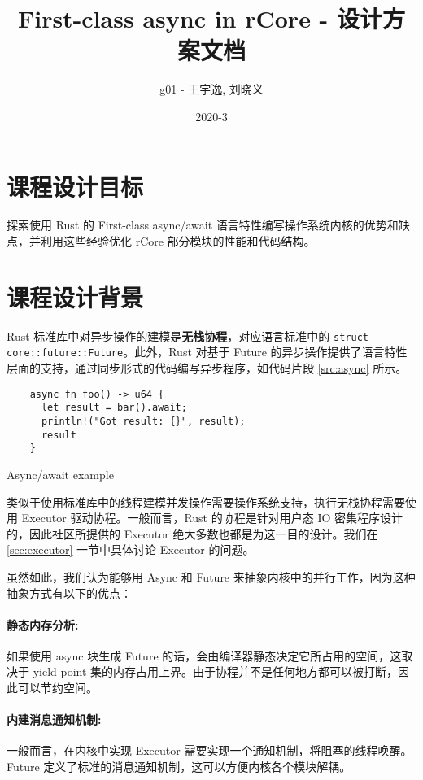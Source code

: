 \documentclass[UTF-8]{ctexart}
\title{First-class async in rCore - 设计方案文档}
\author{g01 - 王宇逸, 刘晓义}
\date{2020-3}
\begin{document}
\maketitle

\section{课程设计目标}
  探索使用 Rust 的 First-class async/await 语言特性编写操作系统内核的优势和缺点，并利用这些经验优化 rCore 部分模块的性能和代码结构。

\section{课程设计背景}
  Rust 标准库中对异步操作的建模是\textbf{无栈协程}，对应语言标准中的 \texttt{struct core::future::Future}。此外，Rust 对基于 Future 的异步操作提供了语言特性层面的支持，通过同步形式的代码编写异步程序，如代码片段 \ref{src:async} 所示。

  \begin{listing}[H]
  \begin{verbatim}
    async fn foo() -> u64 {
      let result = bar().await;
      println!("Got result: {}", result);
      result
    }
  \end{verbatim}
  \caption{Async/await example}
  \label{src:async}
  \end{listing}

  类似于使用标准库中的线程建模并发操作需要操作系统支持，执行无栈协程需要使用 Executor 驱动协程。一般而言，Rust 的协程是针对用户态 IO 密集程序设计的，因此社区所提供的 Executor 绝大多数也都是为这一目的设计。我们在 \ref{sec:executor} 一节中具体讨论 Executor 的问题。

  虽然如此，我们认为能够用 Async 和 Future 来抽象内核中的并行工作，因为这种抽象方式有以下的优点：

  \paragraph{静态内存分析:} 如果使用 async 块生成 Future 的话，会由编译器静态决定它所占用的空间，这取决于 yield point 集的内存占用上界。由于协程并不是任何地方都可以被打断，因此可以节约空间。

  \paragraph{内建消息通知机制:} 一般而言，在内核中实现 Executor 需要实现一个通知机制，将阻塞的线程唤醒。Future 定义了标准的消息通知机制，这可以方便内核各个模块解耦。
\end{document}
